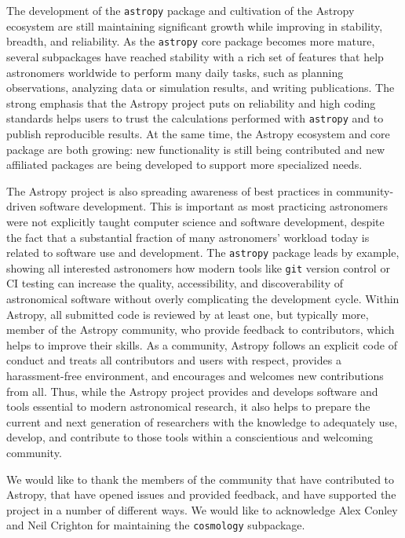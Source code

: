 \documentclass[modern]{aastex61}
\newcommand{\package}[1]{\texttt{#1}\xspace}
\newcommand{\astropy}{Astropy\xspace}
\newcommand{\astropypkg}{\package{astropy}}
\begin{document}
The development of the \astropypkg package and cultivation of the \astropy
ecosystem are still maintaining significant growth while improving in stability,
breadth, and reliability.
As the \astropypkg core package becomes more mature, several subpackages have
reached stability with a rich set of features that help astronomers worldwide to
perform many daily tasks, such as planning observations, analyzing data or
simulation results, and writing publications.
The strong emphasis that the \astropy project puts on reliability and high coding
standards helps users to trust the calculations performed with \astropypkg and
to publish reproducible results.
At the same time, the \astropy ecosystem and core package are both growing: new
functionality is still being contributed and new affiliated packages are being
developed to support more specialized needs.

The \astropy project is also spreading awareness of best practices in
community-driven software development.
This is important as most practicing astronomers were not explicitly taught
computer science and software development, despite the fact that a substantial
fraction of many astronomers' workload today is related to software use
and development.
The \astropypkg package leads by example, showing all interested astronomers how
modern tools like \texttt{git} version control or CI testing can
increase the quality, accessibility, and discoverability of astronomical
software without overly complicating the development cycle.
Within \astropy, all submitted code is reviewed by at least one, but typically
more, member of the \astropy community, who provide feedback to contributors,
which helps to improve their skills.
As a community, \astropy follows an explicit code of conduct \citep{ape8} and treats all
contributors and users with respect, provides a harassment-free environment, and
encourages and welcomes new contributions from all.
Thus, while the \astropy project provides and develops software and tools
essential to modern astronomical research, it also helps to prepare the current
and next generation of researchers with the knowledge to adequately use,
develop, and contribute to those tools within a conscientious and welcoming
community.

\acknowledgments 

We would like to thank the members of the community that have 
contributed to \astropy, 
that have opened issues and provided feedback, and have supported the 
project in a number of different ways.  We would like to acknowledge
Alex Conley and Neil Crighton for maintaining the  \package{cosmology} 
subpackage. 
\end{document}
